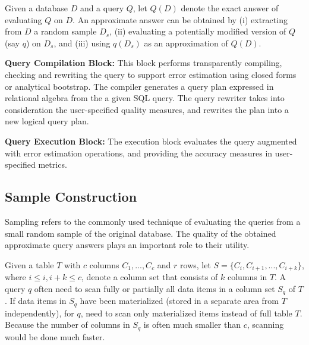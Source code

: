 \documentclass{sig-alternate-05-2015}
\begin{document}
Given a database $D$ and a query $Q$, let $Q(D)$ denote the exact answer of evaluating $Q$ on $D$. 
An approximate answer can be obtained by (i) extracting from $D$ a random sample $D_s$, (ii) evaluating a potentially modified version of $Q$ (say $q$) on $D_s$, and (iii) using $q(D_s)$ as an approximation of $Q(D)$.

\noindent
\textbf{Query Compilation Block:} 
This block performs transparently compiling, checking and rewriting the query to support error estimation using closed forms or analytical bootstrap. The compiler generates a query plan expressed in relational algebra from the a given SQL query. 
The query rewriter takes into consideration the user-specified quality measures, and rewrites the plan into a new logical query plan.

\noindent
\textbf{Query Execution Block:} 
The execution block evaluates the query augmented with error estimation operations, and providing the accuracy measures in user-specified metrics. 

\subsection{Sample Construction}
Sampling refers to the commonly used technique of evaluating the queries from a small random sample of the original database. The quality of the obtained approximate query answers plays an important role to their utility.

Given a table $T$ with $c$ columns $C_1, ..., C_c$ and $r$ rows, let $S=\{C_i, C_{i+1}, ..., C_{i+k}\}$, where $ i \leq i, i+k \leq c$, denote a column set that consists of $k$ columns in $T$. A query $q$ often need to scan fully or partially all data items in a column set $S_q$ of $T$. If data items in $S_q$ have been materialized (stored in a separate area from $T$ independently), for $q$, need to scan only materialized items instead of full table $T$. Because the number of columns in $S_q$ is often much smaller than $c$, scanning would be done much faster.
\end{document}
